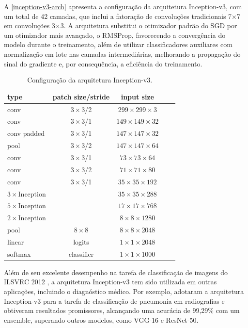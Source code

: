 A \autoref{inception-v3-arch} apresenta a configuração da arquitetura Inception-v3, com um total de 42 camadas, que inclui a fatoração de convoluções tradicionais 7×7 em convoluções 3×3. A arquitetura substitui o otimizador padrão do SGD por um otimizador mais avançado, o RMSProp, favorecendo a convergência do modelo durante o treinamento, além de utilizar classificadores auxiliares com normalização em lote nas camadas intermediárias, melhorando a propagação do sinal do gradiente e, por consequência, a eficiência do treinamento.

\begin{table}[h]
    \centering
    \footnotesize
    \begin{tabular}{|l|c|c|c|c|}
        \hline
        \textbf{type} & \textbf{patch size/stride} & \textbf{input size} \\
        \hline
        conv & $3\times3$/2 & $299\times299\times3$ \\
        \hline
        conv & $3\times3$/1 & $149\times149\times32$ \\
        \hline
        conv padded & $3\times3$/1 & $147\times147\times32$ \\
        \hline
        pool & $3\times3$/2 & $147\times147\times64$ \\
        \hline
        conv & $3\times3$/1 & $73\times73\times64$ \\
        \hline
        conv & $3\times3$/2 & $71\times71\times80$ \\
        \hline
        conv & $3\times3$/1 & $35\times35\times192$ \\
        \hline
        $3\times$Inception &  & $35\times35\times288$ \\
        \hline
        $5\times$Inception &  & $17\times17\times768$ \\
        \hline
        $2\times$Inception &  & $8\times8\times1280$ \\
        \hline
        pool & $8\times8$ & $8\times8\times2048$ \\
        \hline
        linear & logits & $1\times1\times2048$ \\
        \hline
        softmax & classifier & $1\times1\times1000$ \\
        \hline
    \end{tabular}
    \caption{Configuração da arquitetura Inception-v3.}
    \label{inception-v3-arch}
\end{table}

Além de seu excelente desempenho na tarefa de classificação de imagens do ILSVRC 2012 \citep{Russakovsky2015}, a arquitetura Inception-v3 tem sido utilizada em outras aplicações, incluindo o diagnóstico médico. Por exemplo, \cite{Mujahid2022} adotaram a arquitetura Inception-v3 para a tarefa de classificação de pneumonia em radiografias e obtiveram resultados promissores, alcançando uma acurácia de 99,29\% com um ensemble, superando outros modelos, como VGG-16 e ResNet-50.

